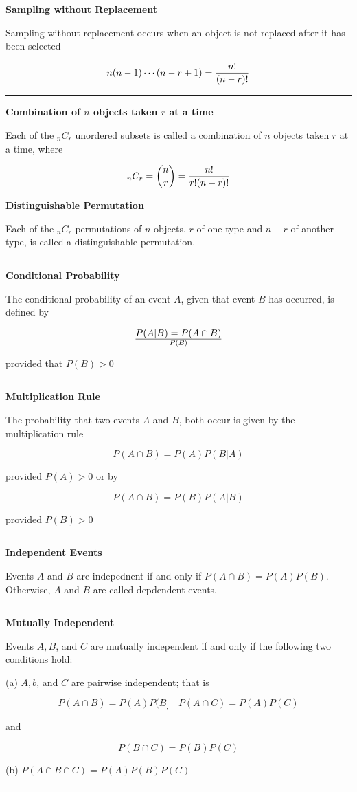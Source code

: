 \vskip 6pt
{\bf Sampling without Replacement}

\vskip 1mm
Sampling without replacement occurs when an object is not replaced after it has been selected

$$n(n-1)\cdots(n-r+1)={n!\over (n-r)!}$$

\vskip 3mm
\hrule

\vskip 6pt
{\bf Combination of $n$ objects taken $r$ at a time}

\vskip 1mm
Each of the ${}_nC_r$ unordered subsets is called a combination of $n$ objects taken $r$ at a time, where

$${}_nC_r={n\choose r}={n!\over r!(n-r)!}$$

\vskip 15mm
{\bf Distinguishable Permutation}

\vskip 1mm
Each of the ${}_nC_r$ permutations of $n$ objects, $r$ of one type and $n-r$ of another type, is called a distinguishable permutation.

\vskip 3mm
\hrule

\vskip 6pt
{\bf Conditional Probability}

\vskip 1mm
The conditional probability of an event $A$, given that event $B$ has occurred, is defined by

$$P(A|B)={P(A\cap B})\over P(B)$$

provided that $P(B)>0$

\vskip 3mm
\hrule

\vskip 6pt
{\bf Multiplication Rule}

\vskip 1mm
The probability that two events $A$ and $B$, both occur is given by the multiplication rule

$$P(A\cap B)=P(A)P(B|A)$$

provided $P(A)>0$ or by

$$P(A\cap B)=P(B)P(A|B)$$

provided $P(B)>0$

\vskip 3mm
\hrule

\vskip 6pt
{\bf Independent Events}

\vskip 1mm
Events $A$ and $B$ are indepednent if and only if $P(A\cap B)=P(A)P(B)$. Otherwise, $A$ and $B$ are called depdendent events.

\vskip 3mm
\hrule

\vskip 6pt
{\bf Mutually Independent}

Events $A,B$, and $C$ are mutually independent if and only if the following two conditions hold:

\vskip 1mm
(a) $A,b$, and $C$ are pairwise independent; that is

$$P(A\cap B)=P(A)P(B_,\quad P(A\cap C)=P(A)P(C)$$

and

$$P(B\cap C)=P(B)P(C)$$

(b) $P(A\cap B\cap C)=P(A)P(B)P(C)$

\vskip 3mm
\hrule


\vfill\eject
\bye
